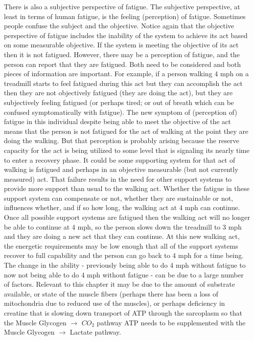 There is also a subjective perspective of fatigue. The subjective perspective, at least in terms of human fatigue, is the feeling (perception) of fatigue. Sometimes people confuse the subject and the objective. Notice again that the objective perspective of fatigue includes the inability of the system to achieve its act based on some measurable objective. If the system is meeting the objective of its act then it is not fatigued. However, there may be a perception of fatigue, and the person can report that they are fatigued. Both need to be considered and both pieces of information are important. For example, if a person walking 4 mph on a treadmill starts to feel fatigued during this act but they can accomplish the act then they are not objectively fatigued (they are doing the act), but they are subjectively feeling fatigued (or perhaps tired; or out of breath which can be confused symptomatically with fatigue). The new symptom of (perception of) fatigue in this individual despite being able to meet the objective of the act means that the person is not fatigued for the act of walking at the point they are doing the walking. But that perception is probably arising because the reserve capacity for the act is being utilized to some level that is signaling its nearly time to enter a recovery phase. It could be some supporting system for that act of walking is fatigued and perhaps in an objective measurable (but not currently measured) act. That failure results in the need for other support systems to provide more support than usual to the walking act. Whether the fatigue in these support system can compensate or not, whether they are sustainable or not, influences whether, and if so how long, the walking act at 4 mph can continue. Once all possible support systems are fatigued then the walking act will no longer be able to continue at 4 mph, so the person slows down the treadmill to 3 mph and they are doing a new act that they can continue. At this new walking act, the energetic requirements may be low enough that all of the support systems recover to full capability and the person can go back to 4 mph for a time being. The change in the ability - previously being able to do 4 mph without fatigue to now not being able to do 4 mph without fatigue - can be due to a large number of factors. Relevant to this chapter it may be due to the amount of substrate available, or state of the muscle fibers (perhaps there has been a loss of mitochondria due to reduced use of the muscles), or perhaps deficiency in creatine that is slowing down transport of ATP through the sarcoplasm so that the Muscle Glycogen $\rightarrow$ $CO_2$ pathway ATP needs to be supplemented with the Muscle Glycogen $\rightarrow$ Lactate pathway.

